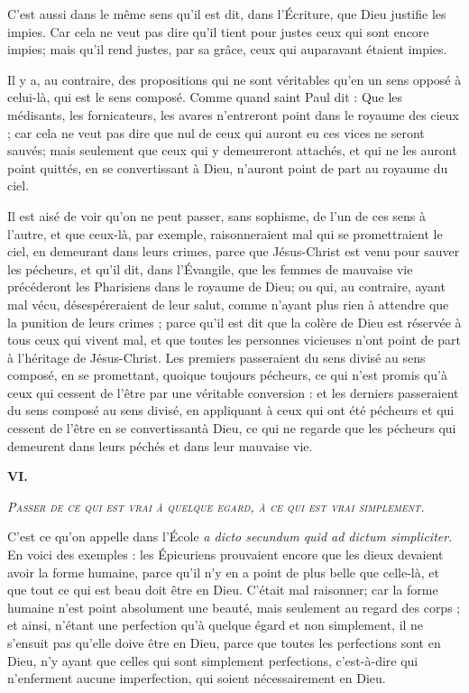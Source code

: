 C'est aussi dans le même sens qu'il est dit, dans l'Écriture, que Dieu justifie les impies. Car cela ne veut pas dire qu'il tient pour justes ceux qui sont encore impies; mais qu'il rend justes, par sa grâce, ceux qui auparavant étaient impies.

Il y a, au contraire, des propositions qui ne sont véritables qu'en un sens opposé à celui-là, qui est le sens composé. Comme quand saint Paul dit : Que les médisants, les fornicateurs, les avares n'entreront point dans le royaume des cieux ; car cela ne veut pas dire que nul de ceux qui auront eu ces vices ne seront sauvés; mais seulement que ceux qui y demeureront attachés, et qui ne les auront point quittés, en se convertissant à Dieu, n'auront point de part au royaume du ciel.

Il est aisé de voir qu'on ne peut passer, sans sophisme, de l'un de ces sens à l'autre, et que ceux-là, par exemple, raisonneraient mal qui se promettraient le ciel, en demeurant dans leurs crimes, parce que Jésus-Christ est venu pour sauver les pécheurs, et qu'il dit, dans l'Évangile, que les femmes de mauvaise vie précéderont les Pharisiens dans le royaume de Dieu; ou qui, au contraire, ayant mal vécu, désespéreraient de leur salut, comme n'ayant plus rien à attendre que la punition de leurs crimes ; parce qu'il est dit que la colère de Dieu est réservée à tous ceux qui vivent mal, et que toutes les personnes vicieuses n'ont point de part à l'héritage de Jésus-Christ. Les premiers passeraient du sens divisé au sens composé, en se promettant, quoique toujours pécheurs, ce qui n'est promis qu'à ceux qui cessent de l'être par une véritable conversion : et les derniers passeraient du sens composé au sens divisé, en appliquant à ceux qui ont été pécheurs et qui cessent de l'être en se convertissantà Dieu, ce qui ne regarde que les pécheurs qui demeurent dans leurs péchés et dans leur mauvaise vie.

\begin{center}{\bfseries\large VI.}\end{center}
\begin{center}\emph{\scshape Passer de ce qui est vrai à quelque egard, à ce qui est vrai simplement.}\end{center}

C'est ce qu'on appelle dans l'École \emph{a dicto secundum quid ad dictum simpliciter}. En voici des exemples : les Épicuriens prouvaient encore que les dieux devaient avoir la forme humaine, parce qu'il n'y en a point de plus belle que celle-là, et que tout ce qui est beau doit être en Dieu. C'était mal raisonner; car la forme humaine n'est point absolument une beauté, mais seulement au regard des corps ; et ainsi, n'étant une perfection qu'à quelque égard et non simplement, il ne s'ensuit pas qu'elle doive être en Dieu, parce que toutes les perfections sont en Dieu, n'y ayant que celles qui sont simplement perfections, c'est-à-dire qui n'enferment aucune imperfection, qui soient nécessairement en Dieu.

